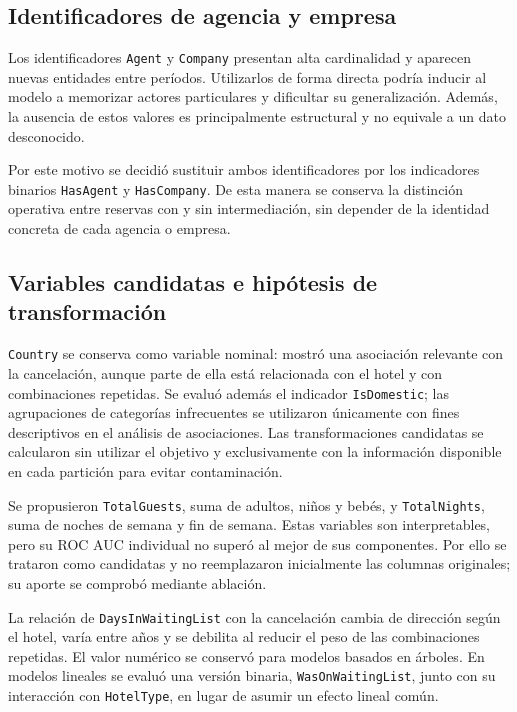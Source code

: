 \subsection{Identificadores de agencia y empresa}

Los identificadores \texttt{Agent} y \texttt{Company} presentan alta
cardinalidad y aparecen nuevas entidades entre períodos. Utilizarlos de forma
directa podría inducir al modelo a memorizar actores particulares y dificultar
su generalización. Además, la ausencia de estos valores es principalmente
estructural y no equivale a un dato desconocido.

Por este motivo se decidió sustituir ambos identificadores por los indicadores
binarios \texttt{HasAgent} y \texttt{HasCompany}. De esta manera se conserva
la distinción operativa entre reservas con y sin intermediación, sin depender
de la identidad concreta de cada agencia o empresa.

\subsection{Variables candidatas e hipótesis de transformación}

\texttt{Country} se conserva como variable nominal: mostró una asociación
relevante con la cancelación, aunque parte de ella está relacionada con el
hotel y con combinaciones repetidas. Se evaluó además el indicador
\texttt{IsDomestic}; las agrupaciones de categorías infrecuentes se utilizaron
únicamente con fines descriptivos en el análisis de asociaciones. Las
transformaciones candidatas se calcularon sin
utilizar el objetivo y exclusivamente con la información disponible en
cada partición para evitar contaminación.

Se propusieron \texttt{TotalGuests}, suma de adultos, niños y bebés, y
\texttt{TotalNights}, suma de noches de semana y fin de semana. Estas variables
son interpretables, pero su ROC AUC individual no superó al mejor de sus
componentes. Por ello se trataron como candidatas y no reemplazaron inicialmente
las columnas originales; su aporte se comprobó mediante ablación.

La relación de \texttt{DaysInWaitingList} con la cancelación cambia de
dirección según el hotel, varía entre años y se debilita al reducir el peso de
las combinaciones repetidas. El valor numérico se conservó para modelos basados
en árboles. En modelos lineales se evaluó una versión
binaria, \texttt{WasOnWaitingList}, junto con su interacción con
\texttt{HotelType}, en lugar de asumir un efecto lineal común.

